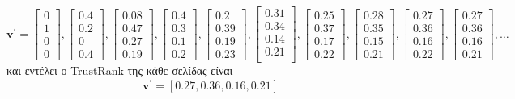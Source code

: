 \documentclass[a4paper,11pt]{article}
\begin{document}
\[
	\textbf{v}^\prime =
	\begin{bmatrix}0 \\ 1 \\ 0 \\ 0\end{bmatrix},
	\begin{bmatrix}0.4 \\ 0.2 \\ 0 \\ 0.4\end{bmatrix},
	\begin{bmatrix}0.08 \\ 0.47 \\ 0.27 \\ 0.19\end{bmatrix},
	\begin{bmatrix}0.4 \\ 0.3 \\ 0.1 \\ 0.2\end{bmatrix},
	\begin{bmatrix}0.2 \\ 0.39 \\ 0.19 \\ 0.23\end{bmatrix},
	\begin{bmatrix}0.31 \\ 0.34 \\ 0.14 \\ 0.21 \\ \end{bmatrix},
	\begin{bmatrix}0.25 \\ 0.37 \\ 0.17 \\ 0.22\end{bmatrix},
	\begin{bmatrix}0.28 \\ 0.35 \\ 0.15 \\ 0.21\end{bmatrix},
	\begin{bmatrix}0.27 \\ 0.36 \\ 0.16 \\ 0.22\end{bmatrix},
	\begin{bmatrix}0.27 \\ 0.36 \\ 0.16 \\ 0.21\end{bmatrix},
	\dots
\]
και εντέλει ο TrustRank της κάθε σελίδας είναι
\[ \textbf{v}^\prime = [0.27,0.36,0.16,0.21]\]
\end{document}
